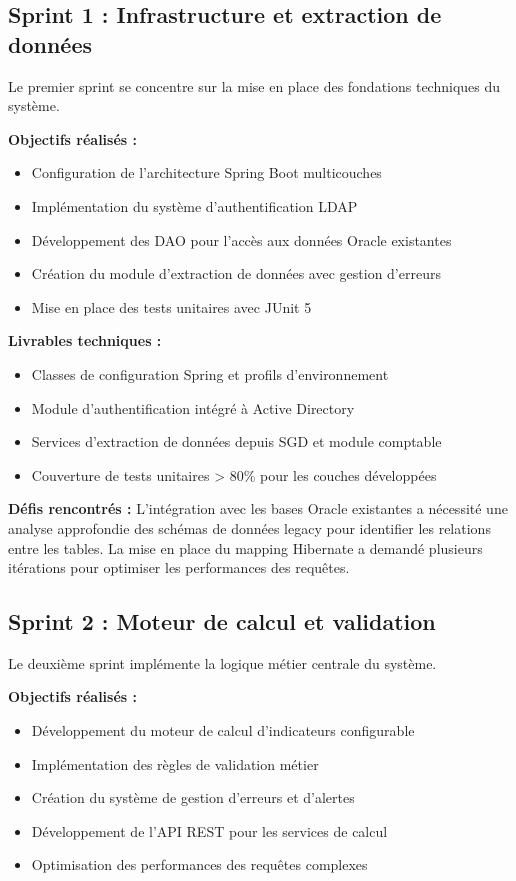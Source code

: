 \subsection{Sprint 1 : Infrastructure et extraction de données}

Le premier sprint se concentre sur la mise en place des fondations techniques du système.

\medskip

\textbf{Objectifs réalisés :}
\begin{itemize}
    \item Configuration de l'architecture Spring Boot multicouches
    \item Implémentation du système d'authentification LDAP
    \item Développement des DAO pour l'accès aux données Oracle existantes
    \item Création du module d'extraction de données avec gestion d'erreurs
    \item Mise en place des tests unitaires avec JUnit 5
\end{itemize}

\textbf{Livrables techniques :}
\begin{itemize}
    \item Classes de configuration Spring et profils d'environnement
    \item Module d'authentification intégré à Active Directory
    \item Services d'extraction de données depuis SGD et module comptable
    \item Couverture de tests unitaires > 80\% pour les couches développées
\end{itemize}

\textbf{Défis rencontrés :}
L'intégration avec les bases Oracle existantes a nécessité une analyse approfondie des schémas de données legacy pour identifier les relations entre les tables. La mise en place du mapping Hibernate a demandé plusieurs itérations pour optimiser les performances des requêtes.

\subsection{Sprint 2 : Moteur de calcul et validation}

Le deuxième sprint implémente la logique métier centrale du système.

\medskip

\textbf{Objectifs réalisés :}
\begin{itemize}
    \item Développement du moteur de calcul d'indicateurs configurable
    \item Implémentation des règles de validation métier
    \item Création du système de gestion d'erreurs et d'alertes
    \item Développement de l'API REST pour les services de calcul
    \item Optimisation des performances des requêtes complexes
\end{itemize}

